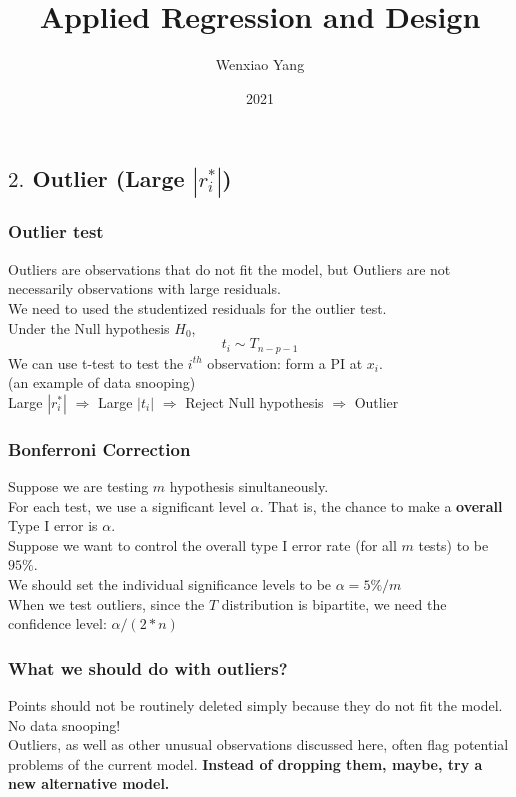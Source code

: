 \documentclass[11pt,a4paper]{article}
\title{Applied Regression and Design}
\author[*]{Wenxiao Yang}
\affil[*]{Department of Mathematics, University of Illinois at Urbana-Champaign}
\date{2021}
\begin{document}
\maketitle
\tableofcontents
\newpage



\subsection{ $2.$ Outlier (Large $|r_i^*|$)}
\subsubsection{Outlier test}
Outliers are observations that do not ﬁt the model, but Outliers are not necessarily observations with large residuals.\\
We need to used the studentized residuals for the outlier test.\\
Under the Null hypothesis $H_0$,
$$t_i\sim T_{n-p-1}$$
We can use t-test to test the $i^{th}$ observation: form a PI at $x_i$.\\
(an example of data snooping)\\
Large $|r_i^*|$ $\Rightarrow$ Large $|t_i|$ $\Rightarrow$ Reject Null hypothesis $\Rightarrow$ Outlier
\subsubsection{Bonferroni Correction}
Suppose we are testing $m$ hypothesis sinultaneously.\\
For each test, we use a signiﬁcant level $\alpha$. That is, the chance to make a \textbf{overall} Type I error is $\alpha$.\\
Suppose we want to control the overall type I error rate (for all $m$ tests) to be $95\%$.\\
We should set the individual signiﬁcance levels to be $\alpha = 5\%/m$\\

When we test outliers, since the $T$ distribution is bipartite, we need the confidence level: $\alpha/(2*n)$
\subsubsection{What we should do with outliers?}
Points should not be routinely deleted simply because they do not ﬁt the model. No data snooping!\\
Outliers, as well as other unusual observations discussed here, often ﬂag potential problems of the current model. \textbf{Instead of dropping them, maybe, try a new alternative model.}
\end{document}
